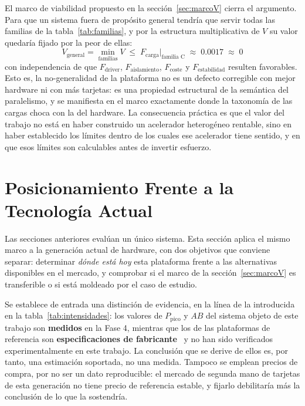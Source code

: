 \documentclass[a4paper,11pt]{article}
\begin{document}
El marco de viabilidad propuesto en la sección~\ref{sec:marcoV} cierra el argumento. Para que un sistema fuera de propósito general tendría que
servir todas las familias de la tabla~\ref{tab:familias}, y por la estructura multiplicativa de $V$ su valor quedaría fijado por
la peor de ellas:
\begin{equation}\label{eq:v_general}
    V_{\text{general}} = \min_{\text{familias}} V
    \;\le\; F_{\text{carga}}\big|_{\text{familia C}}
    \;\approx\; 0.0017 \;\approx\; 0
\end{equation}
con independencia de que $F_{\text{driver}}$, $F_{\text{aislamiento}}$, $F_{\text{coste}}$ y $F_{\text{estabilidad}}$ resulten
favorables. Esto es, la no-generalidad de la plataforma no es un defecto corregible con mejor hardware ni con más tarjetas: es
una propiedad estructural de la semántica del paralelismo, y se manifiesta en el marco exactamente donde la taxonomía de las
cargas choca con la del hardware. La consecuencia práctica es que el valor del trabajo no está en haber construido un
acelerador heterogéneo rentable, sino en haber establecido los límites dentro de los cuales ese acelerador tiene sentido, y en
que esos límites son calculables antes de invertir esfuerzo.

\section{Posicionamiento Frente a la Tecnología Actual}\label{sec:posicionamiento}

Las secciones anteriores evalúan un único sistema. Esta sección aplica el mismo marco a la generación actual de hardware,
con dos objetivos que conviene separar: determinar \emph{dónde está hoy} esta plataforma frente a las alternativas disponibles en
el mercado, y comprobar si el marco de la sección~\ref{sec:marcoV} es transferible o si está moldeado por el caso de estudio.

Se establece de entrada una distinción de evidencia, en la línea de la introducida en la tabla~\ref{tab:intensidades}: los valores
de $P_{\text{pico}}$ y $AB$ del sistema objeto de este trabajo son \textbf{medidos} en la Fase 4, mientras que los de las
plataformas de referencia son \textbf{especificaciones de fabricante}~\cite{nvidiac1060,nvidiartxblackwell,nvidiaproblackwell,nvidiablackwellultra,nvidiahgx} y
no han sido verificados experimentalmente en este trabajo. La conclusión que se derive de ellos es, por tanto, una estimación
soportada, no una medida. Tampoco se emplean precios de compra, por no ser un dato reproducible: el mercado de segunda mano de
tarjetas de esta generación no tiene precio de referencia estable, y fijarlo debilitaría más la conclusión de lo que la
sostendría.
\end{document}
